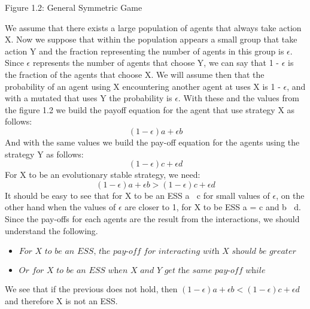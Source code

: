 \documentclass{article}
\begin{document}
\begin{center}
	Figure 1.2: General Symmetric Game
\end{center}
We assume that there exists a large population of agents that always take action X. Now we suppose that within the population appears a small group that take action Y and the   fraction representing the number of agents in this group is $\epsilon$.  Since $\epsilon$ represents the number of agents that choose Y, we can say that 1 - $\epsilon$ is the fraction of the agents that choose X.  We will assume then that the probability of an agent using X encountering another agent at uses X is 1 - $\epsilon$, and with a mutated that uses Y the probability is $\epsilon$.  With these and the values from the figure 1.2 we build the payoff equation for the agent that use strategy X as follows:
\begin{equation}
(1-{\epsilon})a + {\epsilon}b
\end{equation}
And with the same values we build the pay-off equation for the agents using the strategy Y as follows:
\begin{equation}
(1-{\epsilon})c + {\epsilon}d
\end{equation}
For X to be an evolutionary stable strategy, we need:
\begin{equation}
(1-{\epsilon})a + {\epsilon}b > (1-{\epsilon})c + {\epsilon}d
\end{equation}
It should be easy to see that for X to be an ESS a $\>$ c for small values of $\epsilon$, on the other hand when the values of $\epsilon$ are closer to 1, for X to be ESS a = c and b $\>$ d.
Since the pay-offs for each agents are the result from the interactions, we should understand the following.
\begin{itemize}
\item $\textit{For X to be an ESS, the pay-off for interacting with X should be greater or at least equal to the pay-off that an Y gets when interacting with X.}$ 
\item $\textit{Or for X to be an ESS when X and Y get the same pay-off while interacting with X, X needs to get a better pay-off when interacting with Y than Y interacting with Y.}$ 
\end{itemize}
We see that if the previous does not hold, then $(1-{\epsilon})a + {\epsilon}b < (1-{\epsilon})c + {\epsilon}d$ and therefore X is not an ESS.
\end{document}
